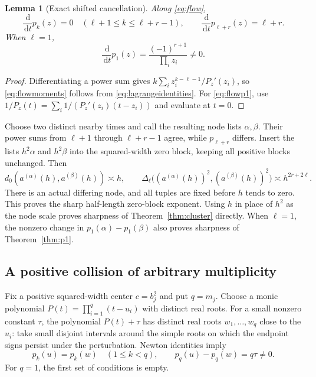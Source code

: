 \documentclass[11pt,a4paper]{article}
\numberwithin{equation}{section}
\newtheorem{lemma}[theorem]{Lemma}
\theoremstyle{definition}
\theoremstyle{remark}
\newcommand{\dd}{\,\mathrm d}
\begin{document}
\begin{lemma}[Exact shifted cancellation]
\label{lem:flow}
Along \eqref{eq:flow},
\begin{equation}
 \frac{\dd}{\dd t}p_k(z)=0\quad(\ell+1\le k\le\ell+r-1),\qquad
 \frac{\dd}{\dd t}p_{\ell+r}(z)=\ell+r.
 \label{eq:flowmoments}
\end{equation}
When $\ell=1$,
\begin{equation}
 \frac{\dd}{\dd t}p_1(z)=\frac{(-1)^{r+1}}{\prod_i z_i}\ne0.
 \label{eq:flowp1}
\end{equation}
\end{lemma}
\begin{proof}
Differentiating a power sum gives
$k\sum_i z_i^{k-\ell-1}/P_z'(z_i)$, so
\eqref{eq:flowmoments} follows from \eqref{eq:lagrangeidentities}.
For \eqref{eq:flowp1}, use
$1/P_z(t)=\sum_i1/(P_z'(z_i)(t-z_i))$ and evaluate at $t=0$.
\end{proof}

Choose two distinct nearby times and call the resulting node lists
$\alpha,\beta$. Their power sums from $\ell+1$ through $\ell+r-1$ agree,
while $p_{\ell+r}$ differs. Insert the lists $h^2\alpha$ and $h^2\beta$ into
the squared-width zero block, keeping all positive blocks unchanged. Then
\begin{equation}
 d_0(a^{(\alpha)}(h),a^{(\beta)}(h))\asymp h,\qquad
 \Delta_\ell\bigl((a^{(\alpha)}(h))^2,(a^{(\beta)}(h))^2\bigr)
      \asymp h^{2r+2\ell}.
 \label{eq:zerosharp}
\end{equation}
There is an actual differing node, and all tuples are fixed before $h$ tends
to zero. This proves the sharp half-length zero-block exponent. Using $h$
in place of $h^2$ as the node scale proves sharpness of
Theorem~\ref{thm:cluster} directly. When $\ell=1$, the nonzero change in
$p_1(\alpha)-p_1(\beta)$ also proves sharpness of Theorem~\ref{thm:p1}.

\subsection{A positive collision of arbitrary multiplicity}
Fix a positive squared-width center $c=b_j^2$ and put $q=m_j$. Choose a monic
polynomial $P(t)=\prod_{i=1}^q(t-u_i)$ with distinct real roots. For a small
nonzero constant $\tau$, the polynomial $P(t)+\tau$ has distinct real roots
$w_1,\ldots,w_q$ close to the $u_i$: take small disjoint intervals around the
simple roots on which the endpoint signs persist under the perturbation.
Newton identities imply
\begin{equation}
 p_k(u)=p_k(w)\quad(1\le k<q),\qquad p_q(u)-p_q(w)=q\tau\ne0.
 \label{eq:positivematching}
\end{equation}
For $q=1$, the first set of conditions is empty.
\end{document}
